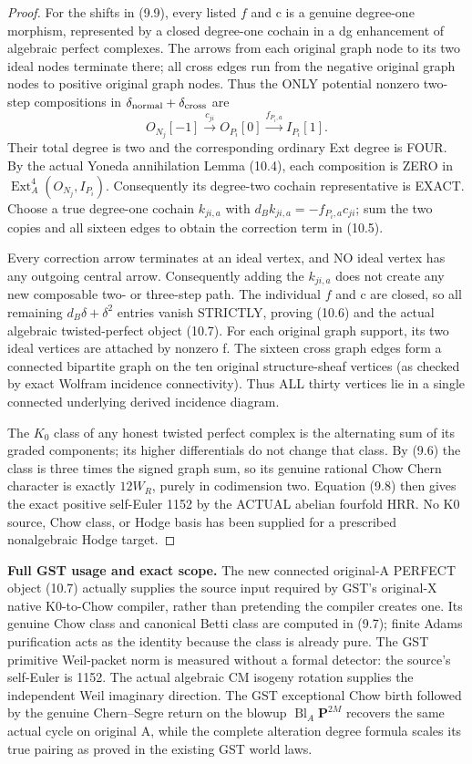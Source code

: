 \documentclass[11pt,a4paper]{article}
\begin{document}
\begin{proof}
For the shifts
in (9.9), every
listed \(f\) and c
is a genuine
degree-one
morphism, represented
by a closed
degree-one cochain
in a dg enhancement
of algebraic
perfect complexes.
The arrows
from each original
graph node to
its two ideal
nodes terminate
there; all
cross edges
run from the
negative original
graph nodes
to positive
original graph
nodes.
Thus the ONLY
potential
nonzero
two-step
compositions in
\(\delta_{\rm normal}
+\delta_{\rm cross}\)
are
\[
 O_{N_j}[-1]
 \xrightarrow{c_{ji}}
 O_{P_i}[0]
 \xrightarrow{f_{P_i,a}}
 I_{P_i}[1].
\]
Their total
degree is two
and the corresponding
ordinary Ext
degree is FOUR.
By the actual
Yoneda annihilation
Lemma (10.4),
each composition
is ZERO in
\(\operatorname{Ext}^4_A
(O_{N_j},I_{P_i})\).
Consequently its
degree-two
cochain representative
is EXACT.
Choose a true
degree-one
cochain \(k_{ji,a}\)
with
\(
 d_B k_{ji,a}
 =-f_{P_i,a}c_{ji}
\);
sum the two copies
and all sixteen
edges to obtain
the correction
term in (10.5).

Every correction
arrow terminates
at an ideal
vertex, and
NO ideal vertex
has any outgoing
central arrow.
Consequently
adding the
\(k_{ji,a}\)
does not
create any
new composable
two- or
three-step
path.
The individual
\(f\) and c
are closed,
so all remaining
\(d_B\delta+\delta^2\)
entries vanish
STRICTLY, proving
(10.6) and the
actual algebraic
twisted-perfect
object (10.7).
For each original
graph support,
its two ideal
vertices are
attached by
nonzero f.
The sixteen
cross graph edges
form a connected
bipartite graph
on the ten
original
structure-sheaf
vertices
(as checked
by exact
Wolfram
incidence
connectivity).
Thus ALL
thirty vertices
lie in a single
connected
underlying
derived incidence
diagram.

The \(K_0\)
class of any
honest twisted
perfect complex
is the alternating
sum of its
graded components;
its higher
differentials do
not change that
class. By (9.6)
the class is
three times
the signed graph
sum, so its
genuine rational
Chow Chern
character is
exactly
\(12W_R\),
purely in
codimension two.
Equation (9.8)
then gives the
exact positive
self-Euler 1152
by the ACTUAL
abelian
fourfold HRR.
No K0 source,
Chow class, or
Hodge basis
has been
supplied for a
prescribed
nonalgebraic
Hodge target.
\end{proof}

\noindent\textbf{Full GST usage and exact scope.}
The new connected
original-A
PERFECT object
(10.7) actually
supplies the
source input
required by
GST's
original-X
native K0-to-Chow
compiler,
rather than
pretending the
compiler creates
one. Its
genuine Chow
class and
canonical Betti
class are
computed in
(9.7); finite
Adams purification
acts as the
identity because
the class is
already pure.
The GST primitive
Weil-packet norm
is measured
without a formal
detector:
the source's
self-Euler
is 1152.
The actual
algebraic
CM isogeny
rotation supplies
the independent
Weil imaginary
direction.
The GST
exceptional
Chow birth
followed by
the genuine
Chern--Segre
return on the
blowup
\(\operatorname{Bl}_A
\mathbf P^{2M}\)
recovers the
same actual
cycle
on original A,
while the
complete
alteration
degree formula
scales its
true pairing
as proved in
the existing
GST world laws.
\end{document}
